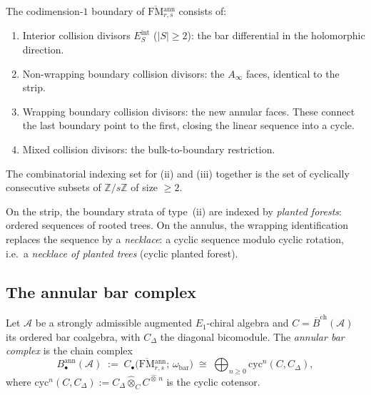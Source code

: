 \documentclass[11pt]{article}
\newcommand{\cA}{\mathcal{A}}
\newcommand{\barB}{\overline{B}}
\newcommand{\Z}{\mathbb{Z}}
\newcommand{\FM}{\mathrm{FM}}
\begin{document}
\begin{proposition}
\label{prop:annular-strata-wn}
The codimension-$1$ boundary of
$\overline{\FM}{}^{\mathrm{ann}}_{r,s}$ consists of:
\begin{enumerate}[label=\textup{(\roman*)}]
\item Interior collision divisors $E_S^{\mathrm{int}}$
($|S|\ge 2$): the bar differential in the holomorphic direction.
\item Non-wrapping boundary collision divisors: the $A_\infty$
faces, identical to the strip.
\item Wrapping boundary collision divisors: the new
annular faces.  These connect the last boundary point to
the first, closing the linear sequence into a cycle.
\item Mixed collision divisors: the bulk-to-boundary restriction.
\end{enumerate}
The combinatorial indexing set for (ii) and (iii) together
is the set of cyclically consecutive subsets of $\Z/s\Z$
of size $\ge 2$.
\end{proposition}

\begin{observation}
\label{obs:necklace-trees-wn}
On the strip, the boundary strata of type~(ii) are indexed by
\emph{planted forests}: ordered sequences of rooted trees.  On the
annulus, the wrapping identification replaces the sequence by a
\emph{necklace}: a cyclic sequence modulo cyclic rotation, i.e.\
a \emph{necklace of planted trees} (cyclic planted forest).
\end{observation}

\subsection{The annular bar complex}
\label{subsec:annular-bar-complex-wn}

\begin{definition}
\label{def:annular-bar-wn}
Let $\cA$ be a strongly admissible augmented $E_1$-chiral algebra
and $C=\barB^{\mathrm{ch}}(\cA)$ its ordered bar coalgebra, with
$C_\Delta$ the diagonal bicomodule.  The \emph{annular bar complex}
is the chain complex
\[
B^{\mathrm{ann}}_\bullet(\cA)
\;:=\;
C_\bullet\!\bigl(
\overline{\FM}{}^{\mathrm{ann}}_{r,s};\,
\omega_{\mathrm{bar}}
\bigr)
\;\cong\;
\bigoplus_{n\ge 0}
\mathrm{cyc}^n(C,C_\Delta),
\]
where $\mathrm{cyc}^n(C,C_\Delta):=
C_\Delta\widehat\otimes_C C^{\widehat\otimes\,n}$ is the
cyclic cotensor.
\end{definition}
\end{document}
